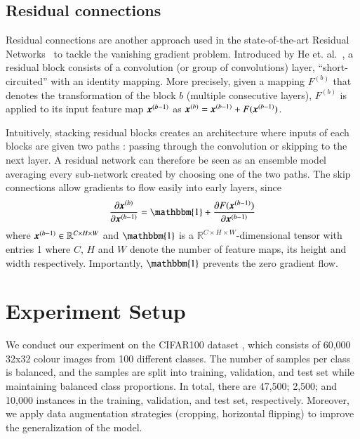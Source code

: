 \documentclass{article}
\begin{document}
\subsection{Residual connections}

Residual connections are another approach used in the state-of-the-art Residual Networks~\cite{he2016deep} to tackle the vanishing gradient problem.
Introduced by He et. al.~\cite{he2016deep}, a residual block consists of a
convolution (or group of convolutions) layer, ``short-circuited'' with an identity mapping.
More precisely, given a mapping $F^{(b)}$ that denotes the transformation of the block $b$ (multiple consecutive layers), $F^{(b)}$ is applied to its input
feature map $\bm{x}^{(b-1)}$ as $\bm{x}^{(b)} = \bm{x}^{(b-1)} + {F}(\bm{x}^{(b-1)})$.

Intuitively, stacking residual blocks creates an architecture where inputs of each blocks
are given two paths : passing through the convolution or skipping to the next layer. A residual network can therefore be seen as an ensemble model averaging every sub-network
created by choosing one of the two paths. The skip connections allow gradients to flow
easily into early layers, since 
\begin{equation}
    \frac{\partial \bx^{(b)}}{\partial \bx^{(b-1)}} = \mathbbm{1} + \frac{\partial{F}(\bx^{(b-1)})}{\partial \bx^{(b-1)}}
    \label{eq.grad_skip}
\end{equation} where $\bm{x}^{(b-1)} \in \mathbb{R}^{C \times H \times W }$ and $\mathbbm{1}$ is a $\mathbb{R}^{C \times H \times W}$-dimensional tensor with entries 1 where $C$, $H$ and $W$ denote the number of feature maps, its height and width respectively. 
Importantly, $\mathbbm{1}$ prevents the zero gradient flow.


\section{Experiment Setup}

\questionFigureFour

\questionFigureFive

\questionTableOne

We conduct our experiment on the CIFAR100 dataset \cite{krizhevsky2009learning},
which consists of 60,000 32x32 colour images from 100 different classes. The number of samples per class is balanced, and the
samples are split into training, validation, and test set while
maintaining balanced class proportions. In total, there are 47,500; 2,500; and 10,000 instances in the training, validation,
and test set, respectively. Moreover, we apply data augmentation strategies (cropping, horizontal flipping) to improve the generalization of the model.
\end{document}
